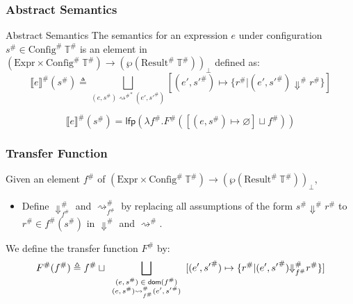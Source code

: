 \documentclass{beamer}
\newcommand*{\A}[1]{{#1}^{\#}}
\newcommand*{\Expr}{\text{Expr}}
\newcommand*{\Time}{\mathbb{T}}
\newcommand*{\ATime}{\A{\Time}}
\newcommand*{\AConfig}[1]{\A{\text{Config}}\:{#1}}
\newcommand*{\AResult}[1]{\A{\text{Result}}\:{#1}}
\newcommand*{\sembracket}[1]{\lBrack{#1}\rBrack}
\begin{document}
\begin{frame}[c]
  \frametitle{Abstract Semantics}
  \begin{block}{Abstract Semantics}
    The semantics for an expression $e$ under configuration $\A{s}\in\AConfig{\ATime}$ is an element in $(\Expr\times\AConfig{\ATime})\rightarrow(\wp(\AResult{\ATime}))_{\bot}$ defined as:
    \[
      \A{\sembracket{e}}(\A{s})\triangleq\bigsqcup_{(e,\A{s}){\A\rightsquigarrow}^{*}(e',\A{s'})}[(e',\A{s'})\mapsto\{\A{r}|(e',\A{s'})\A\Downarrow \A{r}\}]
    \]
  \end{block}

  \[
    \A{\sembracket{e}}(\A{s})=\mathsf{lfp}(\lambda \A{f}.\A{F}([(e,\A{s})\mapsto\varnothing]\sqcup\A{f}))
  \]
\end{frame}
\begin{frame}[c]
  \frametitle{Transfer Function}
  \begin{definition}
    Given an element $\A{f}$ of $(\Expr\times\AConfig{\ATime})\rightarrow(\wp(\AResult{\ATime}))_{\bot}$,

    \begin{itemize}
      \item Define $\A{\Downarrow}_{\A{f}}$ and $\A{\rightsquigarrow}_{\A{f}}$ by replacing all assumptions of the form $\A{s}\A\Downarrow\A{r}$ to $\A{r}\in\A{f}(\A{s})$ in $\A\Downarrow$ and $\A\rightsquigarrow$.
    \end{itemize}

    We define the transfer function $\A{F}$ by:
    \[
      \A{F}(\A{f})\triangleq\A{f}\sqcup\bigsqcup_{
      \scriptsize
      \begin{array}{c}
        (e,\A{s})\in\mathsf{dom}(\A{f}) \\
        (e,\A{s})\A{\rightsquigarrow}_{\A{f}}(e',\A{s'})
      \end{array}}[(e',\A{s'})\mapsto\{\A{r}|(e',\A{s'})\A{\Downarrow}_{\A{f}}\A{r}\}]
    \]
  \end{definition}
\end{frame}
\end{document}
